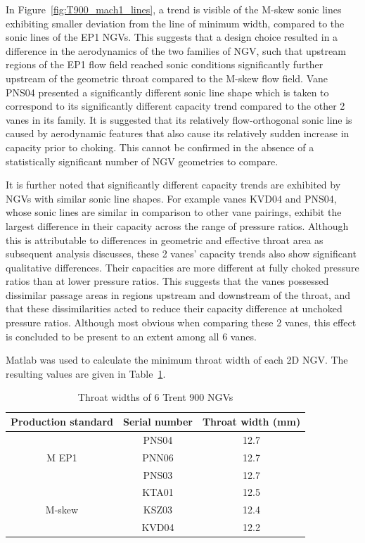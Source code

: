 \documentclass[a4paper, 11pt, oneside]{report}
\begin{document}
In Figure~\ref{fig:T900_mach1_lines}, a trend is visible of the M-skew sonic lines exhibiting smaller deviation from the line of minimum width, compared to the sonic lines of the EP1 NGVs. This suggests that a design choice resulted in a difference in the aerodynamics of the two families of NGV, such that upstream regions of the EP1 flow field reached sonic conditions significantly further upstream of the geometric throat compared to the M-skew flow field. Vane PNS04 presented a significantly different sonic line shape which is taken to correspond to its significantly different capacity trend compared to the other 2 vanes in its family. It is suggested that its relatively flow-orthogonal sonic line is caused by aerodynamic features that also cause its relatively sudden increase in capacity prior to choking. This cannot be confirmed in the absence of a statistically significant number of NGV geometries to compare.

It is further noted that significantly different capacity trends are exhibited by NGVs with similar sonic line shapes. For example vanes KVD04 and PNS04, whose sonic lines are similar in comparison to other vane pairings, exhibit the largest difference in their capacity across the range of pressure ratios. Although this is attributable to differences in geometric and effective throat area as subsequent analysis discusses, these 2 vanes' capacity trends  also show significant qualitative differences. Their capacities are more different at fully choked pressure ratios than at lower pressure ratios. This suggests that the vanes possessed dissimilar passage areas in regions upstream and downstream of the throat, and that these dissimilarities acted to reduce their capacity difference at unchoked pressure ratios. Although most obvious when comparing these 2 vanes, this effect is concluded to be present to an extent among all 6 vanes.

Matlab was used to calculate the minimum throat width of each 2D NGV. The resulting values are given in Table~\ref{T900_throat_widths}.

\begin{table}[H]
\caption{Throat widths of 6 Trent 900 NGVs}
\label{T900_throat_widths}
\begin{center}
\begin{tabular}{|c|c|c|}
\hline
Production standard & Serial number & Throat width (mm)\\
\hline
\multirow{3}{*}{M EP1} & PNS04 & 12.7\\
 & PNN06 & 12.7\\
 & PNS03 & 12.7\\
\hline
\multirow{3}{*}{M-skew} & KTA01 & 12.5\\
 & KSZ03 & 12.4\\
 & KVD04 & 12.2\\
\hline
\end{tabular}
\end{center}
\end{table}
\end{document}
